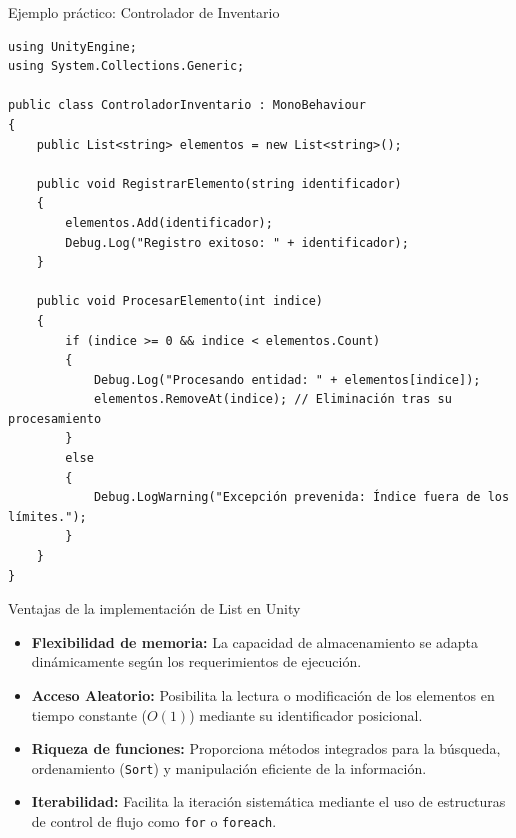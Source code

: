 \documentclass{beamer}
\begin{document}
\begin{frame}[fragile]{Ejemplo práctico: Controlador de Inventario}
\begin{lstlisting}[style=CSharpStyle]
using UnityEngine;
using System.Collections.Generic;

public class ControladorInventario : MonoBehaviour
{
    public List<string> elementos = new List<string>();

    public void RegistrarElemento(string identificador)
    {
        elementos.Add(identificador);
        Debug.Log("Registro exitoso: " + identificador);
    }

    public void ProcesarElemento(int indice)
    {
        if (indice >= 0 && indice < elementos.Count)
        {
            Debug.Log("Procesando entidad: " + elementos[indice]);
            elementos.RemoveAt(indice); // Eliminación tras su procesamiento
        }
        else
        {
            Debug.LogWarning("Excepción prevenida: Índice fuera de los límites.");
        }
    }
}
\end{lstlisting}
\end{frame}

\begin{frame}{Ventajas de la implementación de List en Unity}
\begin{itemize}
    \item \textbf{Flexibilidad de memoria:} La capacidad de almacenamiento se adapta dinámicamente según los requerimientos de ejecución.
    \item \textbf{Acceso Aleatorio:} Posibilita la lectura o modificación de los elementos en tiempo constante ($O(1)$) mediante su identificador posicional.
    \item \textbf{Riqueza de funciones:} Proporciona métodos integrados para la búsqueda, ordenamiento (\texttt{Sort}) y manipulación eficiente de la información.
    \item \textbf{Iterabilidad:} Facilita la iteración sistemática mediante el uso de estructuras de control de flujo como \texttt{for} o \texttt{foreach}.
\end{itemize}
\end{frame}
\end{document}
